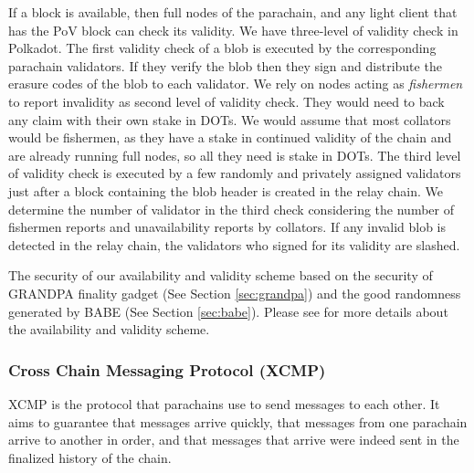 If a block is available, then full nodes of the parachain, and any light client that has the PoV block can check its validity. We have three-level of validity check in Polkadot. The first validity check of a blob is executed by the corresponding parachain validators. If they verify the blob then they sign and distribute the erasure codes of the blob to each validator.
We rely on nodes acting as {\em fishermen} to report invalidity as second level of validity check. They would need to back any claim with their own stake in DOTs. We would assume that most collators would be fishermen, as they have a stake in continued validity of the chain and are already running full nodes, so all they need is stake in DOTs. The third level of validity check is executed by a few randomly and privately assigned validators just after a block containing the blob header is created in the relay chain. We determine the number of validator in the third check considering the number of fishermen reports and unavailability reports by collators. If  any invalid blob is detected in the relay chain, the validators who signed for its validity are slashed.

The security of our availability and validity scheme based on the security of GRANDPA finality gadget (See Section \ref{sec:grandpa}) and the good randomness generated by BABE (See Section \ref{sec:babe}). Please see \cite{availandvalid} for more details about the availability and validity scheme.


\subsubsection{Cross Chain Messaging Protocol (XCMP)} \label{sec:ICMP}
XCMP is the protocol that parachains use to send messages to each other. It aims to guarantee that messages arrive quickly, that messages from one parachain arrive to another in order,
and that messages that arrive were indeed sent in the finalized history of the chain.

